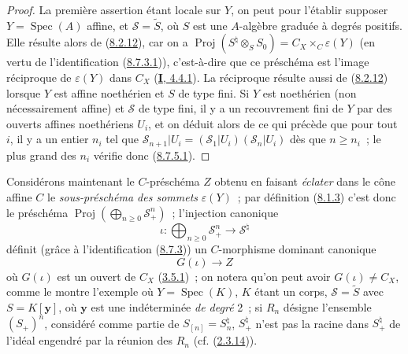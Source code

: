 \begin{proof}
La première assertion étant locale sur $Y$, on peut pour l'établir supposer
$Y=\operatorname{Spec}(A)$ affine, et $\mathcal{S}=\widetilde{S}$, où $S$ est
une $A$-algèbre graduée à degrés positifs. Elle résulte alors de
(\hyperref[II.8.2.12-fr]{8.2.12}), car on a
$\operatorname{Proj}(S^{\natural}\otimes_S S_0)=
C_X\times_C\varepsilon(Y)$ (en vertu de l'identification
(\hyperref[II.8.7.3.1-fr]{8.7.3.1})), c'est-à-dire que ce préschéma est
l'image réciproque de $\varepsilon(Y)$ dans $C_X$
(\hyperref[I.4.4.1-fr]{\textbf{I}, 4.4.1}). La réciproque résulte aussi de
(\hyperref[II.8.2.12-fr]{8.2.12}) lorsque $Y$ est affine noethérien et $S$ de
type fini.
Si $Y$ est noethérien (non nécessairement affine) et $\mathcal{S}$ de type
fini, il y a un recouvrement fini de $Y$ par des ouverts affines noethériens
$U_i$, et on déduit alors de ce qui précède que pour tout $i$, il y a un
entier $n_i$ tel que
$\mathcal{S}_{n+1}|U_i=(\mathcal{S}_1|U_i)(\mathcal{S}_n|U_i)$ dès que
$n\geqslant n_i$~; le plus grand des $n_i$ vérifie donc
(\hyperref[II.8.7.5.1-fr]{8.7.5.1}).
\end{proof}

\begin{env}[8.7.6]
\label{II.8.7.6-fr}
Considérons maintenant le $C$-préschéma $Z$ obtenu en faisant \emph{éclater}
dans le cône affine $C$ le \emph{sous-préschéma des sommets}
$\varepsilon(Y)$~; par définition (\hyperref[II.8.1.3-fr]{8.1.3}) c'est donc
le préschéma
$\operatorname{Proj}(\bigoplus_{n\geqslant 0}\mathcal{S}_+^n)$~; l'injection
canonique
\begin{equation}
\label{II.8.7.6.1-fr}
  \iota:\bigoplus_{n\geqslant 0}\mathcal{S}_+^n
  \longrightarrow\mathcal{S}^{\natural}
\tag{8.7.6.1}
\end{equation}
définit (grâce à l'identification (\hyperref[II.8.7.3-fr]{8.7.3})) un
$C$-morphisme dominant canonique
\begin{equation}
\label{II.8.7.6.2-fr}
  G(\iota)\longrightarrow Z
\tag{8.7.6.2}
\end{equation}
où $G(\iota)$ est un ouvert de $C_X$ (\hyperref[II.3.5.1-fr]{3.5.1})~; on
notera qu'on peut avoir $G(\iota)\ne C_X$, comme le montre l'exemple où
$Y=\operatorname{Spec}(K)$, $K$ étant un corps, $\mathcal{S}=\widetilde{S}$
avec $S=K[\mathbf{y}]$, où $\mathbf{y}$ est une indéterminée \emph{de degré}
2~; si $R_n$ désigne l'ensemble $(S_+)^n$, considéré comme partie de
$S_{[n]}=S_n^{\natural}$, $S_+^{\natural}$ n'est pas la racine dans
$S_+^{\natural}$ de l'idéal engendré par la réunion des $R_n$ (cf.
(\hyperref[II.2.3.14-fr]{2.3.14})).
\end{env}

